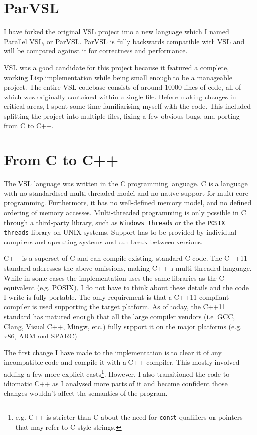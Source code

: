 \section{ParVSL}
I have forked the original VSL project into a new language which I named Parallel VSL, or ParVSL.
ParVSL is fully backwards compatible with VSL and will be compared against it for correctness and
performance.

VSL was a good candidate for this project because it featured a complete, working Lisp implementation while being
small enough to be a manageable project. The entire VSL codebase consists of around 10000 lines of code, all of which
was originally contained within a single file. Before making changes in critical areas, I spent some time familiarising
myself with the code. This included splitting the project into multiple files, fixing a few obvious bugs, and porting
from C to C++.

\section{From C to C++}
The VSL language was written in the C programming language. C is a language with no standardised
multi-threaded model and no native support for multi-core programming. Furthermore, it has no well-defined
memory model, and no defined ordering of memory accesses. Multi-threaded programming
is only possible in C through a third-party library, such as \texttt{Windows threads} or the
the \texttt{POSIX threads} library on UNIX systems. Support has to be provided by individual compilers
and operating systems and can break between versions.

C++ is a superset of C and can compile existing, standard C code. The C++11 standard addresses the
above omissions, making C++ a multi-threaded language. While in some cases the implementation uses the same
libraries as the C equivalent (e.g. POSIX), I do not have to think about these details and the code
I write is fully portable. The only requirement is that a C++11 compliant compiler is used supporting
the target platform. As of today, the C++11 standard has matured enough
that all the large compiler vendors (i.e. GCC, Clang, Visual C++, Mingw, etc.) fully support it on the
major platforms (e.g. x86, ARM and SPARC).

The first change I have made to the implementation is to clear it of any incompatible code and compile it
with a C++ compiler. This mostly involved adding a few more explicit casts\footnote{e.g.
C++ is stricter than C about the need for \texttt{const} qualifiers on pointers that
may refer to C-style strings.}.
However, I also transitioned the code to idiomatic C++ as I analysed more parts of it
and became confident those changes wouldn't affect the semantics of the program.

